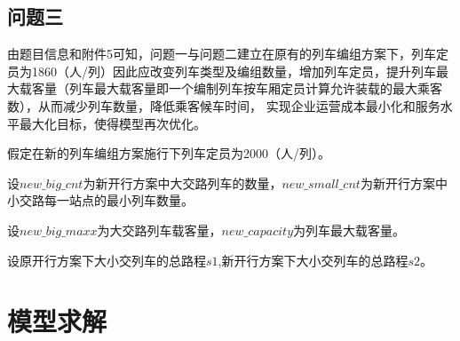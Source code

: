 \documentclass[UTF8]{ctexart}
\begin{document}
\subsection{问题三}
由题目信息和附件5可知，问题一与问题二建立在原有的列车编组方案下，列车定员为1860（人/列）因此应改变列车类型及编组数量，增加列车定员，提升列车最大载客量（列车最大载客量即一个编制列车按车厢定员计算允许装载的最大乘客数），从而减少列车数量，降低乘客候车时间， 实现企业运营成本最小化和服务水平最大化目标，使得模型再次优化。\par
假定在新的列车编组方案施行下列车定员为2000（人/列）。\par
设$new\_big\_cnt$为新开行方案中大交路列车的数量，$new\_small\_cnt$为新开行方案中小交路每一站点的最小列车数量。\par
设$new\_big\_maxx$为大交路列车载客量，$new\_capacity$为列车最大载客量。\par
设原开行方案下大小交列车的总路程$s1$,新开行方案下大小交列车的总路程$s2$。\par
\section{模型求解}
\end{document}

